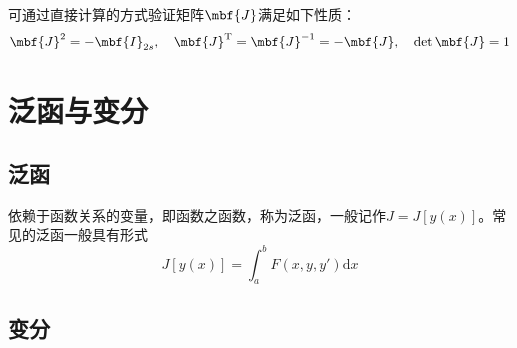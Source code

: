 可通过直接计算的方式验证矩阵$\mbf{J}$满足如下性质：
\begin{equation}
	\mbf{J}^2 = -\mbf{I}_{2s},\quad \mbf{J}^{\mathrm{T}} = \mbf{J}^{-1} = -\mbf{J},\quad \det \mbf{J} = 1
\end{equation}

\section{泛函与变分}

\subsection{泛函}

依赖于函数关系的变量，即函数之函数，称为{\heiti 泛函}，一般记作$J = J[y(x)]$。常见的泛函一般具有形式
\begin{equation*}
	J[y(x)] = \int_a^b F(x,y,y') \mathrm{d} x
\end{equation*}

\subsection{变分}

